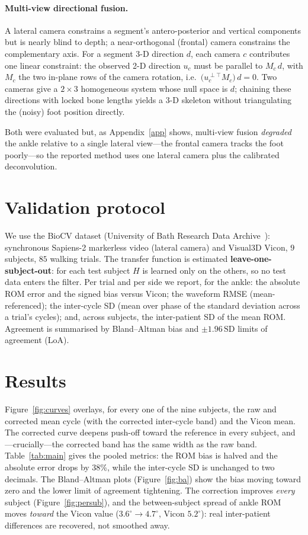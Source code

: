 \documentclass[11pt]{article}
\begin{document}
\paragraph{Multi-view directional fusion.} A lateral camera constrains a segment's antero-posterior and vertical components but is nearly blind to depth; a near-orthogonal (frontal) camera constrains the complementary axis. For a segment 3-D direction $d$, each camera $c$ contributes one linear constraint: the observed 2-D direction $u_c$ must be parallel to $M_c\,d$, with $M_c$ the two in-plane rows of the camera rotation, i.e.\ $\big(u_c^{\perp\!\top} M_c\big)\,d = 0$. Two cameras give a $2\times3$ homogeneous system whose null space is $d$; chaining these directions with locked bone lengths yields a 3-D skeleton without triangulating the (noisy) foot position directly.

Both were evaluated but, as Appendix~\ref{app} shows, multi-view fusion \emph{degraded} the ankle relative to a single lateral view---the frontal camera tracks the foot poorly---so the reported method uses one lateral camera plus the calibrated deconvolution.

\section{Validation protocol}
We use the BioCV dataset (University of Bath Research Data Archive~\cite{biocv}): synchronous Sapiens-2 markerless video (lateral camera) and Visual3D Vicon, $9$ subjects, $85$ walking trials. The transfer function is estimated \textbf{leave-one-subject-out}: for each test subject $H$ is learned only on the others, so no test data enters the filter. Per trial and per side we report, for the ankle: the absolute ROM error and the signed bias versus Vicon; the waveform RMSE (mean-referenced); the inter-cycle SD (mean over phase of the standard deviation across a trial's cycles); and, across subjects, the inter-patient SD of the mean ROM. Agreement is summarised by Bland--Altman bias and $\pm1.96\,\mathrm{SD}$ limits of agreement (LoA).

\section{Results}
Figure~\ref{fig:curves} overlays, for every one of the nine subjects, the raw and corrected mean cycle (with the corrected inter-cycle band) and the Vicon mean. The corrected curve deepens push-off toward the reference in every subject, and---crucially---the corrected band has the same width as the raw band. Table~\ref{tab:main} gives the pooled metrics: the ROM bias is halved and the absolute error drops by 38\%, while the inter-cycle SD is unchanged to two decimals. The Bland--Altman plots (Figure~\ref{fig:ba}) show the bias moving toward zero and the lower limit of agreement tightening. The correction improves \emph{every} subject (Figure~\ref{fig:persub}), and the between-subject spread of ankle ROM moves \emph{toward} the Vicon value ($3.6^\circ\!\to\!4.7^\circ$, Vicon $5.2^\circ$): real inter-patient differences are recovered, not smoothed away.
\end{document}
